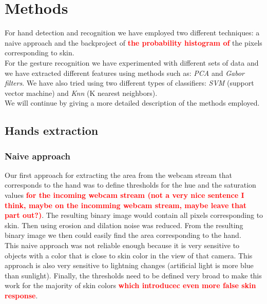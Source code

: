 \documentclass[a4paper, 11pt, twocolumn]{article}
\newcommand{\todo}[1]{\textcolor{red}{\textbf{#1}}}
\begin{document}
    \section{Methods}
	\label{sec:methods}
		For hand detection and recognition we have employed two different techniques: a naive approach and the backproject of \todo{the probability histogram of} the pixels corresponding to skin.\\
		\hspace*{10px}For the gesture recognition we have experimented with different sets of data and we have extracted different features using methods such as: \emph{PCA} and \emph{Gabor filters}. We have also tried using two different types of classifiers: \emph{SVM} (support vector machine) and \emph{Knn} (K nearest neighbors).\\
		\hspace*{10px}We will continue by giving a more detailed description of the methods employed. 
        \subsection{Hands extraction}
		\label{sec:Meth_exrctHands}
        \subsubsection{Naive approach}
		 Our first approach for extracting the area from the webcam stream that corresponds to the hand was to define thresholds for the hue and the saturation values \todo{for the incoming webcam stream (not a very nice sentence I think, maybe on the incomming webcam stream, maybe leave that part out?)}. The resulting binary image would contain all pixels corresponding to skin. Then using erosion and dilation noise was reduced. From the resulting binary image we then could easily find the area corresponding to the hand.\\
       	\hspace*{10px}This naive approach was not reliable enough because it is very sensitive to objects with a color that is close to skin color in the view of that camera. This approach is also very sensitive to lightning changes (artificial light is more blue than sunlight). Finally, the thresholds need to be defined very broad to make this work for the majority of skin colors \todo{which introducec even more false skin response}.        
\end{document}
